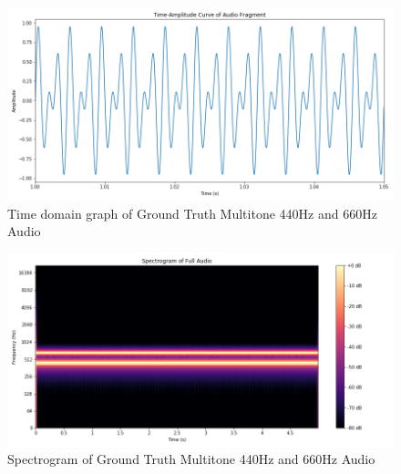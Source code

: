 \documentclass{ioereport}
\begin{document}
    \begin{figure}[H]
        \centering
        \includegraphics[width=\linewidth]{assets/audio_results/multitoneA4E4time.png}
        \caption{Time domain graph of Ground Truth Multitone 440Hz and 660Hz Audio}
        \label{fig:gt-multitonea4e4-time}
    \end{figure}
    \begin{figure}[H]
        \centering
        \includegraphics[width=\linewidth]{assets/audio_results/multitoneA4E4spec.png}
        \caption{Spectrogram of Ground Truth Multitone 440Hz and 660Hz Audio}
        \label{fig:gt-multitonea4e4-spec}
    \end{figure}
    
\end{document}
